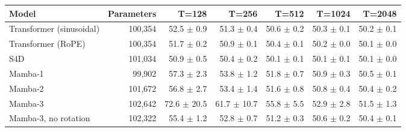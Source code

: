 \begin{tabular}{lrrrrrr}
\toprule
Model & Parameters & T=128 & T=256 & T=512 & T=1024 & T=2048 \\
\midrule
Transformer (sinusoidal) & 100,354 & 52.5 $\pm$ 0.9 & 51.3 $\pm$ 0.4 & 50.6 $\pm$ 0.2 & 50.3 $\pm$ 0.1 & 50.2 $\pm$ 0.1 \\
Transformer (RoPE) & 100,354 & 51.7 $\pm$ 0.2 & 50.9 $\pm$ 0.1 & 50.4 $\pm$ 0.1 & 50.2 $\pm$ 0.0 & 50.1 $\pm$ 0.0 \\
S4D & 101,034 & 50.9 $\pm$ 0.5 & 50.4 $\pm$ 0.2 & 50.1 $\pm$ 0.1 & 50.1 $\pm$ 0.1 & 50.1 $\pm$ 0.0 \\
Mamba-1 & 99,902 & 57.3 $\pm$ 2.3 & 53.8 $\pm$ 1.2 & 51.8 $\pm$ 0.7 & 50.9 $\pm$ 0.3 & 50.5 $\pm$ 0.1 \\
Mamba-2 & 101,672 & 56.8 $\pm$ 2.7 & 53.4 $\pm$ 1.4 & 51.6 $\pm$ 0.8 & 50.8 $\pm$ 0.4 & 50.4 $\pm$ 0.2 \\
Mamba-3 & 102,642 & 72.6 $\pm$ 20.5 & 61.7 $\pm$ 10.7 & 55.8 $\pm$ 5.5 & 52.9 $\pm$ 2.8 & 51.5 $\pm$ 1.3 \\
Mamba-3, no rotation & 102,322 & 55.4 $\pm$ 1.2 & 52.8 $\pm$ 0.7 & 51.2 $\pm$ 0.3 & 50.6 $\pm$ 0.2 & 50.4 $\pm$ 0.1 \\
\bottomrule
\end{tabular}
\par{}
